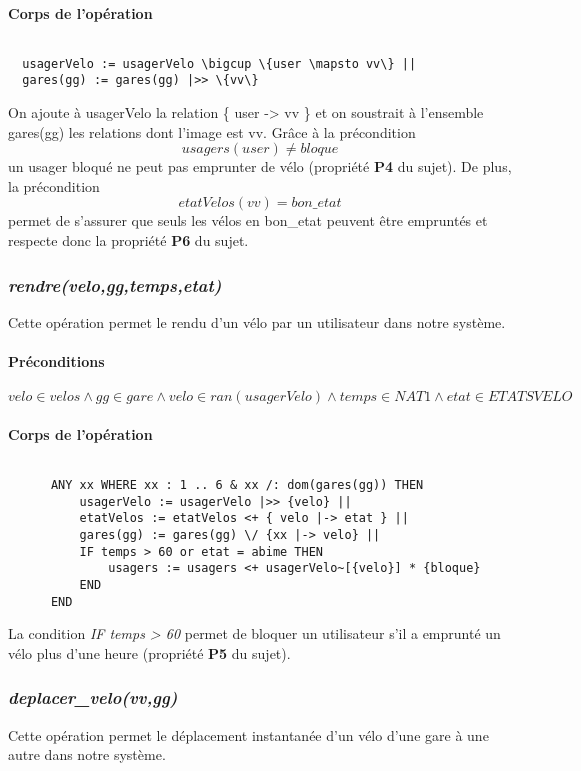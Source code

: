 \documentclass[12pt]{article}
\begin{document}
\paragraph{Corps de l'opération}
\[\]
\begin{lstlisting}
  usagerVelo := usagerVelo \bigcup \{user \mapsto vv\} ||
  gares(gg) := gares(gg) |>> \{vv\}
\end{lstlisting}

On ajoute à usagerVelo la relation \{ user -> vv \} et on soustrait à l'ensemble gares(gg) les relations dont l'image est vv. Grâce à la précondition \[ usagers(user) \neq bloque \] un usager bloqué ne peut pas emprunter de vélo (propriété \textbf{P4} du sujet). De plus, la précondition \[etatVelos(vv) = bon\_etat\] permet de s'assurer que seuls les vélos en bon\_etat peuvent être empruntés et respecte donc la propriété \textbf{P6} du sujet.
\subsubsection{\textit{rendre(velo,gg,temps,etat)}}
Cette opération permet le rendu d'un vélo par un utilisateur dans notre système.
\paragraph{Préconditions}
\[ velo \in velos \land gg \in gare \land velo \in ran(usagerVelo) \land temps \in NAT1 \land etat \in ETATSVELO\]

\paragraph{Corps de l'opération}
\[\]
\begin{lstlisting}
      ANY xx WHERE xx : 1 .. 6 & xx /: dom(gares(gg)) THEN
          usagerVelo := usagerVelo |>> {velo} ||
          etatVelos := etatVelos <+ { velo |-> etat } ||
          gares(gg) := gares(gg) \/ {xx |-> velo} ||
          IF temps > 60 or etat = abime THEN
              usagers := usagers <+ usagerVelo~[{velo}] * {bloque}
          END
      END
\end{lstlisting}
La condition \textit{IF temps > 60} permet de bloquer un utilisateur s'il a emprunté un vélo plus d'une heure (propriété \textbf{P5} du sujet).
\subsubsection{\textit{deplacer\_velo(vv,gg)}}
Cette opération permet le déplacement instantanée d'un vélo d'une gare à une autre dans notre système.
\end{document}
